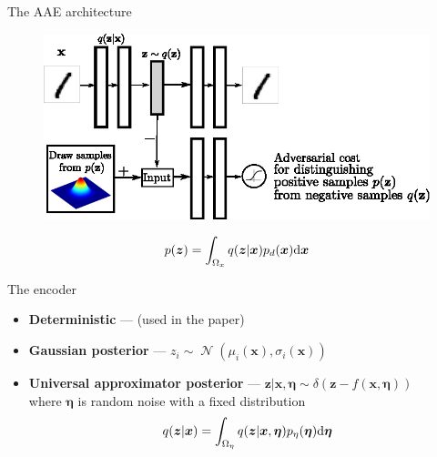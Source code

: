 \documentclass[10pt]{beamer}
\DeclareMathOperator{\Norm}{\mathcal N}
\newcommand{\vect}[1]{\boldsymbol{#1}} %
\begin{document}
\begin{frame}{The AAE architecture}
\begin{figure}
  \centering
  \includegraphics[width=0.8\linewidth]{../images/aae-architecture-01.png}
\end{figure}
\[ p(\vect z) = \int_{\Omega_x} q(\vect z | \vect x) p_d(\vect x) \text d \vect x \]
\end{frame}

\begin{frame}{The encoder}
\begin{itemize}
  \setlength\itemsep{1.5em}
  \item \textbf{Deterministic} — (used in the paper)
  \item \textbf{Gaussian posterior} — $ z_i \sim \Norm(\mu_i(\vect x), \sigma_i(\vect x)) $
  \item \textbf{Universal approximator posterior} — $ \vect z | \vect x, \vect \eta \sim \delta(\vect z - f(\vect x, \vect \eta)) $ \\ where $ \vect \eta $ is random noise with a fixed distribution
  \[ q(\vect z | \vect x) = \int_{\Omega_\eta} q(\vect z | \vect x, \vect \eta) p_\eta(\vect \eta) \text d \vect \eta \]
\end{itemize}
\end{frame}
\end{document}
